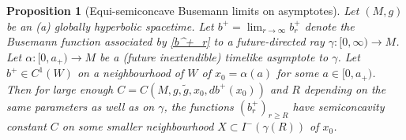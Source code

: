 \documentclass[12pt]{amsart}
\newcommand{\re}{\color{red}}
\newtheorem{proposition}[theorem]{Proposition}
\begin{document}
\begin{proposition}[Equi-semiconcave Busemann limits on asymptotes]\label{P:asymptotes}
Let $(M,g)$ be an (a) globally hyperbolic 
spacetime.
Let $b^+=\lim_{r \to \infty} b^+_r$ denote the Busemann function associated by \eqref{b^+_r} to a future-directed ray $\gamma:[0,\infty)\longrightarrow M$.
Let $\alpha:[0,a_+)\longrightarrow M$ be a 
(future inextendible)
timelike asymptote to $\gamma$. %
Let $b^+ \in C^1(W)$ %
on a neighbourhood of $W$ of %
$x_0=\alpha(a)$ for some $a \in [0, a_+)$. 
Then for large enough 
$C=C(M,g,\tilde g, x_0,db^+(x_0))$ and 
$R$ depending on the same parameters as well as on $\gamma$,
 the functions $(b^+_r)_{r \ge R}$ have semiconcavity constant $C$ on some smaller neighbourhood $X \subset I^-(\gamma(R))$ of $x_0$.
\end{proposition}
\end{document}
